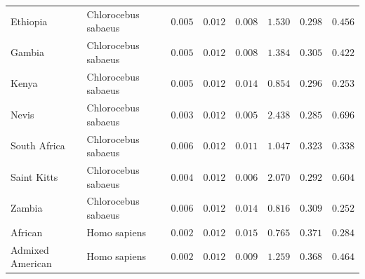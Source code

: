 \documentclass[12pt]{article}
\begin{document}
\begin{center}
\begin{longtable*}{|l|l|r|r|r|r|r|r|}
             Ethiopia & Chlorocebus sabaeus &               $ 0.005$ &              $ 0.012$ &              $ 0.008$ &                                          $ 1.530$ &                         $ 0.298$ &                      $ 0.456$ \\
             Gambia & Chlorocebus sabaeus &               $ 0.005$ &              $ 0.012$ &              $ 0.008$ &                                          $ 1.384$ &                         $ 0.305$ &                      $ 0.422$ \\
             Kenya & Chlorocebus sabaeus &               $ 0.005$ &              $ 0.012$ &              $ 0.014$ &                                          $ 0.854$ &                         $ 0.296$ &                      $ 0.253$ \\
             Nevis & Chlorocebus sabaeus &               $ 0.003$ &              $ 0.012$ &              $ 0.005$ &                                          $ 2.438$ &                         $ 0.285$ &                      $ 0.696$ \\
             South Africa  & Chlorocebus sabaeus &               $ 0.006$ &              $ 0.012$ &              $ 0.011$ &                                          $ 1.047$ &                         $ 0.323$ &                      $ 0.338$ \\
             Saint Kitts & Chlorocebus sabaeus &               $ 0.004$ &              $ 0.012$ &              $ 0.006$ &                                          $ 2.070$ &                         $ 0.292$ &                      $ 0.604$ \\
             Zambia & Chlorocebus sabaeus &               $ 0.006$ &              $ 0.012$ &              $ 0.014$ &                                          $ 0.816$ &                         $ 0.309$ &                      $ 0.252$ \\
            African &        Homo sapiens &               $ 0.002$ &              $ 0.012$ &              $ 0.015$ &                                          $ 0.765$ &                         $ 0.371$ &                      $ 0.284$ \\
            Admixed American &        Homo sapiens &               $ 0.002$ &              $ 0.012$ &              $ 0.009$ &                                          $ 1.259$ &                         $ 0.368$ &                      $ 0.464$ \\

\end{longtable*}
\end{center}
\end{document}
